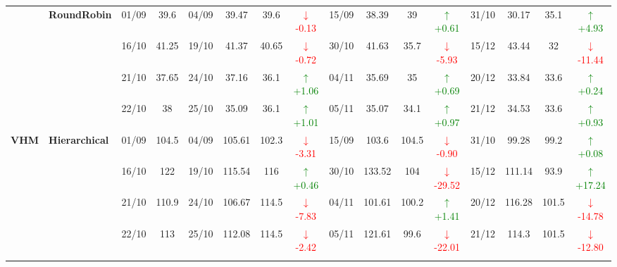 {\begin{longtable}{llcc|cccc|cccc|cccc}
& \textbf{RoundRobin}
& 01/09 & 39.6 & 04/09 & 39.47 & 39.6 & \textcolor{red}{\(\downarrow\)-0.13} & 15/09 & 38.39 & 39 & \textcolor{green}{\(\uparrow\)+0.61} & 31/10 & 30.17 & 35.1 & \textcolor{green}{\(\uparrow\)+4.93} \\

&
& 16/10 & 41.25 & 19/10 & 41.37 & 40.65 & \textcolor{red}{\(\downarrow\)-0.72} & 30/10 & 41.63 & 35.7 & \textcolor{red}{\(\downarrow\)-5.93} & 15/12 & 43.44 & 32 & \textcolor{red}{\(\downarrow\)-11.44} \\

&
& 21/10 & 37.65 & 24/10 & 37.16 & 36.1 & \textcolor{green}{\(\uparrow\)+1.06} & 04/11 & 35.69 & 35 & \textcolor{green}{\(\uparrow\)+0.69} & 20/12 & 33.84 & 33.6 & \textcolor{green}{\(\uparrow\)+0.24} \\

&
& 22/10 & 38 & 25/10 & 35.09 & 36.1 & \textcolor{green}{\(\uparrow\)+1.01} & 05/11 & 35.07 & 34.1 & \textcolor{green}{\(\uparrow\)+0.97} & 21/12 & 34.53 & 33.6 & \textcolor{green}{\(\uparrow\)+0.93} \\
\midrule




\multirow{12}{*}{\textbf{VHM}} 
& \textbf{Hierarchical}
& 01/09 & 104.5 & 04/09 & 105.61 & 102.3 & \textcolor{red}{\(\downarrow\)-3.31} & 15/09 & 103.6 & 104.5 & \textcolor{red}{\(\downarrow\)-0.90} & 31/10 & 99.28 & 99.2 & \textcolor{green}{\(\uparrow\)+0.08} \\

&
& 16/10 & 122 & 19/10 & 115.54 & 116 & \textcolor{green}{\(\uparrow\)+0.46} & 30/10 & 133.52 & 104 & \textcolor{red}{\(\downarrow\)-29.52} & 15/12 & 111.14 & 93.9 & \textcolor{green}{\(\uparrow\)+17.24} \\

&
& 21/10 & 110.9 & 24/10 & 106.67 & 114.5 & \textcolor{red}{\(\downarrow\)-7.83} & 04/11 & 101.61 & 100.2 & \textcolor{green}{\(\uparrow\)+1.41} & 20/12 & 116.28 & 101.5 & \textcolor{red}{\(\downarrow\)-14.78} \\

&
& 22/10 & 113 & 25/10 & 112.08 & 114.5 & \textcolor{red}{\(\downarrow\)-2.42} & 05/11 & 121.61 & 99.6 & \textcolor{red}{\(\downarrow\)-22.01} & 21/12 & 114.3 & 101.5 & \textcolor{red}{\(\downarrow\)-12.80} \\
\cmidrule(lr){2-16}



\end{longtable}}
